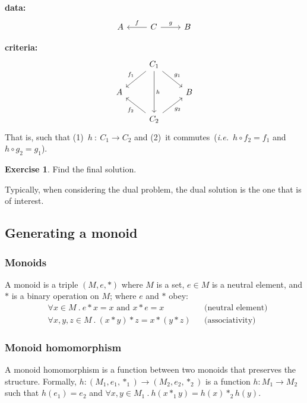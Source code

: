 \documentclass[a4paper, 12pt]{article}
\theoremstyle{definition}
\newtheorem{exercise}{Exercise}
\newcommand{\ie}{\emph{i.e.}}
\begin{document}
\textbf{data:}
$$
\begin{tikzcd}
    A & C \arrow[l, swap, "f"] \arrow[r, "g"] & B
\end{tikzcd}
$$

\textbf{criteria:}
$$
\begin{tikzcd}
    {} & C_1 \arrow[dd, "h"] \arrow[ld, swap, "f_1"] \arrow[rd, "g_1"] & {} \\
    A & {} & B \\
    {} & C_2 \arrow[lu, "f_2"] \arrow[ru, swap, "g_2"] & {}
\end{tikzcd}
$$
That is, such that (1)~$h\ :\ C_1 \rightarrow C_2$ and (2)~it 
commutes~(\ie~$h \circ f_2 = f_1$ and $h \circ g_2 = g_1$).

\begin{exercise}
    Find the final solution.
\end{exercise}

Typically, when considering the dual problem, the dual solution is the one
that is of interest.

\subsection{Generating a monoid}

\subsubsection*{Monoids}

A monoid is a triple $(M, e, \ast)$ where $M$ is a set, $e \in M$ is a neutral
element, and $\ast$ is a binary operation on $M$; where $e$ and $\ast$ obey:
\begin{align*}
    & \forall x \in M\ .\ 
    e \ast x = x \text{ and } x \ast e = x && \text{(neutral
    element)} \\
    & \forall x,y,z \in M\ .\ 
    (x \ast y) \ast z = x \ast (y \ast z) && \text{(associativity)}
\end{align*}

\subsubsection*{Monoid homomorphism}

A monoid homomorphism is a function between two monoids that preserves the
structure. Formally, $h : (M_1, e_1, \ast_1) \rightarrow (M_2, e_2, \ast_2)$
is a function $h: M_1\to M_2$ such that $h(e_1) = e_2$ and $\forall x, y \in
M_1\ .\ h(x \ast_1 y) = h(x) \ast_2 h(y)$.
\end{document}

